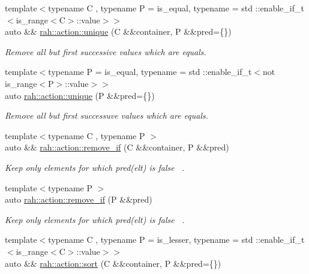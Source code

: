 \begin{DoxyCompactItemize}
{\footnotesize template$<$typename C , typename P  = is\+\_\+equal, typename  = std \+::enable\+\_\+if\+\_\+t$<$is\+\_\+range$<$\+C$>$\+::value$>$$>$ }\\auto \&\& \mbox{\hyperlink{namespacerah_1_1action_a77387ae50600982d52d0d41623747b84}{rah\+::action\+::unique}} (C \&\&container, P \&\&pred=\{\})
\begin{DoxyCompactList}\small\item\em Remove all but first successive values which are equals. \end{DoxyCompactList}\item 
{\footnotesize template$<$typename P  = is\+\_\+equal, typename  = std \+::enable\+\_\+if\+\_\+t$<$not is\+\_\+range$<$\+P$>$\+::value$>$$>$ }\\auto \mbox{\hyperlink{namespacerah_1_1action_a2b3773f4b775a1e64307307556af24cd}{rah\+::action\+::unique}} (P \&\&pred=\{\})
\begin{DoxyCompactList}\small\item\em Remove all but first successuve values which are equals. \end{DoxyCompactList}\item 
{\footnotesize template$<$typename C , typename P $>$ }\\auto \&\& \mbox{\hyperlink{namespacerah_1_1action_ab774cddf0da3ae6a4b505d8a2e05b0c7}{rah\+::action\+::remove\+\_\+if}} (C \&\&container, P \&\&pred)
\begin{DoxyCompactList}\small\item\em Keep only elements for which pred(elt) is false~\newline
. \end{DoxyCompactList}\item 
{\footnotesize template$<$typename P $>$ }\\auto \mbox{\hyperlink{namespacerah_1_1action_a708ce68c6ed2b20ef9c0cdb6b697c980}{rah\+::action\+::remove\+\_\+if}} (P \&\&pred)
\begin{DoxyCompactList}\small\item\em Keep only elements for which pred(elt) is false~\newline
. \end{DoxyCompactList}\item 
{\footnotesize template$<$typename C , typename P  = is\+\_\+lesser, typename  = std \+::enable\+\_\+if\+\_\+t$<$is\+\_\+range$<$\+C$>$\+::value$>$$>$ }\\auto \&\& \mbox{\hyperlink{namespacerah_1_1action_a2bddee3b65a2ecf86d2c3ac49bb41183}{rah\+::action\+::sort}} (C \&\&container, P \&\&pred=\{\})

\end{DoxyCompactItemize}
